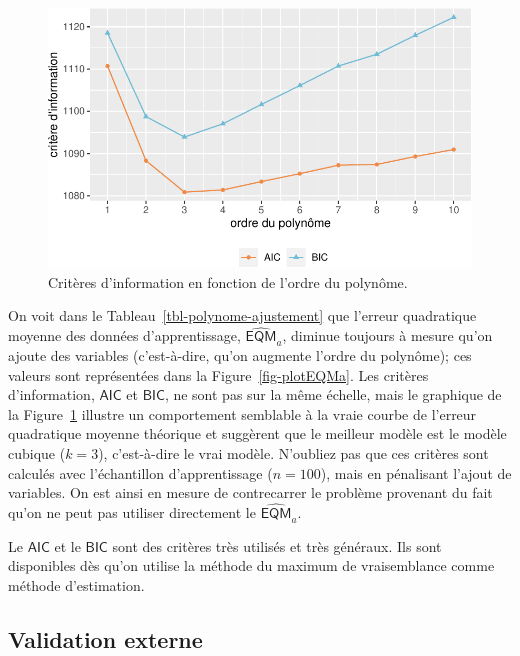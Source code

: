 \documentclass[
  11pt,
  letterpaper,
]{scrbook}
\theoremstyle{definition}
\theoremstyle{remark}
\begin{document}
\begin{figure}[ht!]

{\centering \includegraphics[width=1\textwidth,height=\textheight]{./04-selectionmodeles_files/figure-pdf/fig-polynome-ajustement-1.pdf}

}

\caption{\label{fig-polynome-ajustement}Critères d'information en
fonction de l'ordre du polynôme.}

\end{figure}

On voit dans le Tableau~\ref{tbl-polynome-ajustement} que l'erreur
quadratique moyenne des données d'apprentissage,
\(\widehat{\mathsf{EQM}}_a\), diminue toujours à mesure qu'on ajoute des
variables (c'est-à-dire, qu'on augmente l'ordre du polynôme); ces
valeurs sont représentées dans la Figure~\ref{fig-plotEQMa}. Les
critères d'information, \(\mathsf{AIC}\) et \(\mathsf{BIC}\), ne sont
pas sur la même échelle, mais le graphique de la
Figure~\ref{fig-polynome-ajustement} illustre un comportement semblable
à la vraie courbe de l'erreur quadratique moyenne théorique et suggèrent
que le meilleur modèle est le modèle cubique (\(k=3\)), c'est-à-dire le
vrai modèle. N'oubliez pas que ces critères sont calculés avec
l'échantillon d'apprentissage (\(n=100\)), mais en pénalisant l'ajout de
variables. On est ainsi en mesure de contrecarrer le problème provenant
du fait qu'on ne peut pas utiliser directement le
\(\widehat{\mathsf{EQM}}_a\).

Le \(\mathsf{AIC}\) et le \(\mathsf{BIC}\) sont des critères très
utilisés et très généraux. Ils sont disponibles dès qu'on utilise la
méthode du maximum de vraisemblance comme méthode d'estimation.

\hypertarget{validation-externe}{%
\subsection{Validation externe}\label{validation-externe}}
\end{document}
